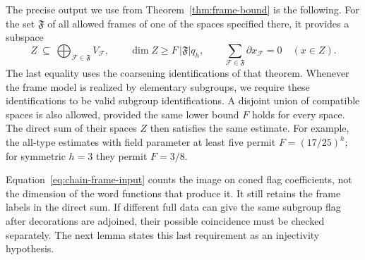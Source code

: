 The precise output we use from Theorem~\ref{thm:frame-bound} is the
following. For the set $\mathfrak F$ of all allowed frames of one
of the spaces specified there, it provides a subspace
\begin{equation}\label{eq:chain-frame-input}
 Z\ \subseteq\ \bigoplus_{\mathcal F\in\mathfrak F}V_{\mathcal F},
 \qquad
 \dim Z\geq F\,|\mathfrak F|q_h,
 \qquad
 \sum_{\mathcal F\in\mathfrak F}\partial x_{\mathcal F}=0
       \quad(x\in Z).
\end{equation}
The last equality uses the coarsening identifications of that
theorem. Whenever the frame model is realized by elementary
subgroups, we require these identifications to be valid subgroup
identifications. A disjoint union of compatible spaces is also
allowed, provided the same lower bound $F$ holds for every space.
The direct sum of their spaces $Z$ then satisfies the same estimate.
For example, the all-type estimates with field parameter at least
five permit $F=(17/25)^h$; for symmetric $h=3$ they permit $F=3/8$.

Equation~\eqref{eq:chain-frame-input} counts the image on coned
flag coefficients, not the dimension of the word functions that
produce it. It still retains the frame labels in the direct sum.
If different full data can give the same subgroup flag after
decorations are adjoined, their possible coincidence must be
checked separately. The next lemma states this last requirement
as an injectivity hypothesis.

